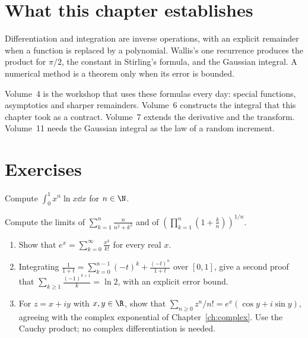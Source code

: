 

\section*{What this chapter establishes}
Differentiation and integration are inverse operations, with an explicit remainder when a function is replaced by a polynomial. Wallis's one recurrence produces the product for $\pi/2$, the constant in Stirling's formula, and the Gaussian integral. A numerical method is a theorem only when its error is bounded.

Volume~4 is the workshop that uses these formulas every day: special functions, asymptotics and sharper remainders. Volume~6 constructs the integral that this chapter took as a contract. Volume~7 extends the derivative and the transform. Volume~11 needs the Gaussian integral as the law of a random increment.

\section{Exercises}

\begin{exercise}[$\star$]\label{ex:xnlnx}
Compute $\displaystyle\int_0^1x^n\ln x\dd x$ for $n\in\N$.
\end{exercise}

\begin{exercise}[$\star$]\label{ex:riemann}
Compute the limits of $\displaystyle\sum_{k=1}^n\frac n{n^2+k^2}$ and of $\displaystyle\left(\prod_{k=1}^n\left(1+\frac kn\right)\right)^{1/n}$.
\end{exercise}

\begin{exercise}[$\star\star$]\label{ex:taylorln}
\begin{enumerate}[label=(\alph*)]
\item Show that $e^x=\sum_{k=0}^\infty\frac{x^k}{k!}$ for every real $x$.
\item Integrating $\frac1{1+t}=\sum_{k=0}^{n-1}(-t)^k+\frac{(-t)^n}{1+t}$ over $[0,1]$, give a second proof that $\sum_{k\ge1}\frac{(-1)^{k+1}}k=\ln2$, with an explicit error bound.
\item For $z=x+iy$ with $x,y\in\R$, show that
$\sum_{n\ge0}z^n/n!=e^x(\cos y+i\sin y)$, agreeing with the complex exponential
of Chapter~\ref{ch:complex}. Use the Cauchy product; no complex differentiation is needed.
\end{enumerate}
\end{exercise}

